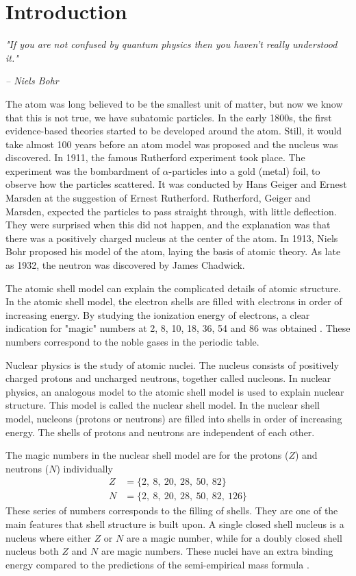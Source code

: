 \documentclass[twoside,english]{uiofysmaster/uiofysmaster}
\begin{document}
\chapter{Introduction}
\epigraph{\textit{"If you are not confused by quantum physics then you haven't really understood it."}}{\textit{– Niels Bohr}}


The atom was long believed to be the smallest unit of matter, but now we know that this is not true, we have subatomic particles. 
In the early 1800s, the first evidence-based theories started to be developed around the atom.
Still, it would take almost 100 years before an atom model was proposed and the nucleus was discovered. 
In 1911, the famous Rutherford experiment took place.
The experiment was the bombardment of $\alpha$-particles into a gold (metal) foil, to observe how the particles scattered.
It was conducted by Hans Geiger and Ernest Marsden at the suggestion of Ernest Rutherford.
Rutherford, Geiger and Marsden, expected the particles to pass straight through, with little deflection. 
They were surprised when this did not happen, and the explanation was that there was a positively charged nucleus at the center of the atom. 
In 1913, Niels Bohr proposed his model of the atom, laying the basis of atomic theory.
As late as 1932, the neutron was discovered by James Chadwick. 

The atomic shell model can explain the complicated details of atomic structure.
In the atomic shell model, the electron shells are filled with electrons in order of increasing energy.
By studying the ionization energy of electrons, a clear indication for "magic" numbers at 2, 8, 10, 18, 36, 54 and 86 was obtained \cite{Heyde}. 
These numbers correspond to the noble gases in the periodic table.

Nuclear physics is the study of atomic nuclei. 
The nucleus consists of positively charged protons and uncharged neutrons, together called nucleons. 
In nuclear physics, an analogous model to the atomic shell model is used to explain nuclear structure.
This model is called the nuclear shell model. 
In the nuclear shell model, nucleons (protons or neutrons) are filled into shells in order of increasing energy. 
The shells of protons and neutrons are independent of each other. 

The magic numbers in the nuclear shell model are for the protons ($Z$) and neutrons ($N$) individually
\begin{align*}
	Z &= \{ 2, ~8, ~20, ~28, ~50, ~82 \} \\
	N &= \{ 2, ~8, ~20, ~28, ~50, ~82, ~126 \}
\end{align*}
These series of numbers corresponds to the filling of shells.
They are one of the main features that shell structure is built upon. 
A single closed shell nucleus is a nucleus where either $Z$ or $N$ are a magic number, while for a doubly closed shell nucleus both $Z$ and $N$ are magic numbers. 
These nuclei have an extra binding energy compared to the predictions of the semi-empirical mass formula \cite{NR}.
\end{document}

